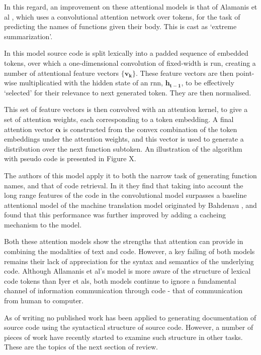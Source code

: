In this regard, an improvement on these attentional models is that of Alamanis et al \cite{allamanis_convolutional_2016}, which uses a convolutional attention network over tokens, for the task of predicting the names of functions given their body. This is cast as `extreme summarization'.

In this model source code is split lexically into a padded sequence of embedded tokens, over which a one-dimensional convolution of fixed-width is run, creating a number of attentional feature vectors $\mathbf{\{v_k\}}$.
These feature vectors are then point-wise multiplicatied with the hidden state of an rnn, $\mathbf{h_{t-1}}$, to be effectively `selected' for their relevance to next generated token. They are then normalised.

This set of feature vectors is then convolved with an attention kernel, to give a set of attention weights, each corresponding to a token embedding. 
A final attention vector $\mathbf{\alpha}$ is constructed from the convex combination of the token embeddings under the attention weights, and this vector is used to generate a distribution over the next function subtoken.
An illustration of the algorithm with pseudo code is presented in Figure X.

The authors of this model apply it to both the narrow task of generating function names, and that of code retrieval. In it they find that taking into account the long range features of the code in the convolutional model surpasses a baseline attentional model of the machine translation model originated by Bahdenau \cite{bahdanau_neural_2014}, and found that this performance was further improved by adding a cacheing mechanism to the model.

Both these attention models show the strengths that attention can provide in combining the modalities of text and code. However, a key failing of both models remains their lack of appreciation for the syntax and semantics of the underlying code.
Although Allamanis et al's model is more aware of the structure of lexical code tokens than Iyer et als, both models continue to ignore a fundamental channel of information communication through code - that of communication from human to computer.


As of writing no published work has been applied to generating documentation of source code using the syntactical structure of source code.  However, a number of pieces of work have recently started to examine such structure in other tasks. These are the topics of the next section of review.

